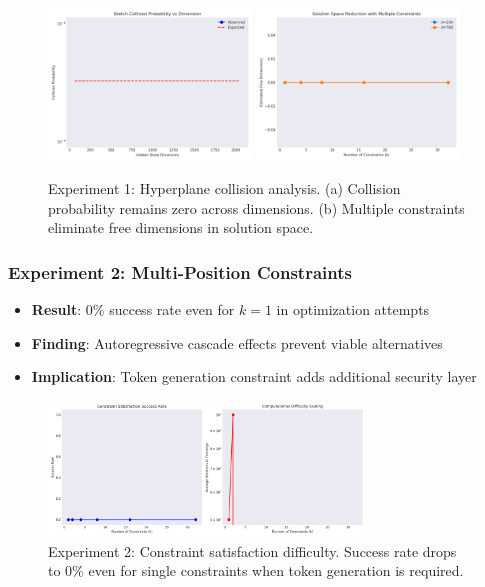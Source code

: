 \documentclass[11pt,a4paper]{article}
\begin{document}
\begin{figure}[ht]
\centering
\includegraphics[width=0.48\textwidth]{experiment_1_collision_probability.png}
\includegraphics[width=0.48\textwidth]{experiment_1_constraint_reduction.png}
\caption{Experiment 1: Hyperplane collision analysis. (a) Collision probability remains zero across dimensions. (b) Multiple constraints eliminate free dimensions in solution space.}
\label{fig:exp1}
\end{figure}

\subsubsection{Experiment 2: Multi-Position Constraints}
\begin{itemize}
    \item \textbf{Result}: 0\% success rate even for $k=1$ in optimization attempts
    \item \textbf{Finding}: Autoregressive cascade effects prevent viable alternatives
    \item \textbf{Implication}: Token generation constraint adds additional security layer
\end{itemize}

\begin{figure}[ht]
\centering
\includegraphics[width=0.75\textwidth]{experiment_2_constraint_difficulty.png}
\caption{Experiment 2: Constraint satisfaction difficulty. Success rate drops to 0\% even for single constraints when token generation is required.}
\label{fig:exp2a}
\end{figure}
\end{document}
